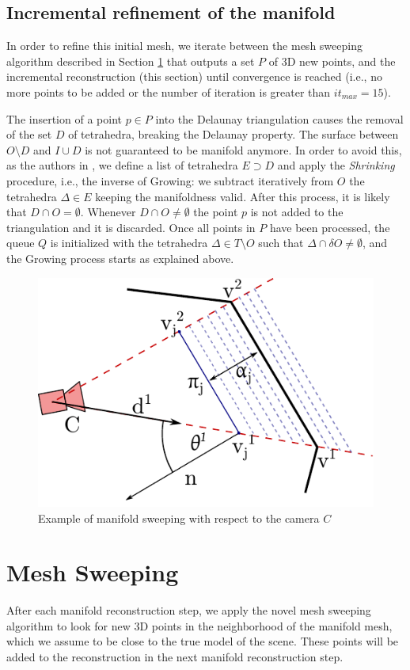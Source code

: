 \subsection{Incremental refinement of the manifold}
In order to refine this initial mesh, we iterate between the mesh sweeping algorithm described in Section \ref{sec:sweep} that outputs a set $P$ of 3D new points, and the incremental reconstruction (this section)  until convergence is reached (i.e., no more points to be added or the number of iteration is greater than $it_{max} = 15$).

The insertion of a point $p\in P$  into the Delaunay triangulation causes the removal of the set $D$ of tetrahedra, breaking the Delaunay property. The surface between $O \setminus D$ and $I \cup D$ is not guaranteed to be manifold anymore. 
In order to avoid this, as the authors in \cite{Litvinov_Lhuillier_13}, we define a list of tetrahedra $E \supset D$ and apply the \emph{Shrinking} procedure, i.e., the inverse of Growing:  we subtract iteratively from $O$ the tetrahedra  $\Delta \in E$ keeping the manifoldness valid.
After this process, it is likely that $D \cap O = \emptyset$.
Whenever $D \cap O \neq \emptyset$ the point $p$ is not added to the triangulation and it is discarded.
Once all points in $P$ have been processed, the queue $Q$ is initialized with the tetrahedra $\Delta \in T \setminus O$ such that  $\Delta \cap \delta O \neq \emptyset$, and the Growing process starts as explained above.


\begin{figure}[tp]
  \centering
  \includegraphics[height=0.3\textwidth]{././img/sweep.pdf}
  \caption{Example of manifold sweeping with respect to the camera $C$}
  \label{fig:sweep}
\end{figure}


 

\section{Mesh Sweeping}
\label{sec:sweep}
After each manifold reconstruction step, we apply the novel mesh sweeping algorithm to look for new 3D points in the neighborhood of the manifold mesh, which we assume to be close to the true model of the scene.
These points will be added to the reconstruction in the next manifold reconstruction step.

